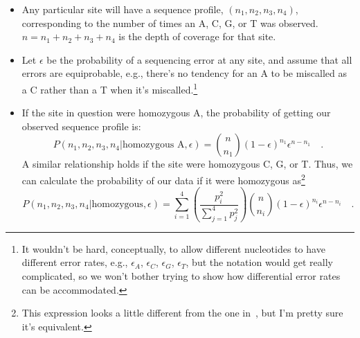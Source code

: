 \documentclass[12pt]{article}
\begin{document}
\begin{itemize}

\item Any particular site will have a sequence profile, $(n_1, n_2,
  n_3, n_4)$, corresponding to the number of times an A, C, G, or T
  was observed. $n=n_1+n_2+n_3+n_4$ is the depth of coverage for that
  site. 

\item Let $\epsilon$ be the probability of a sequencing error at any
  site, and assume that all errors are equiprobable, e.g., there's no
  tendency for an A to be miscalled as a C rather than a T when it's
  miscalled.\footnote{It wouldn't be hard, conceptually, to allow
    different nucleotides to have different error rates, e.g.,
    $\epsilon_A$, $\epsilon_C$, $\epsilon_G$, $\epsilon_T$, but the
    notation would get really complicated, so we won't bother trying
    to show how differential error rates can be accommodated.} 

\item If the site in question were homozygous A, the probability of
  getting our observed sequence profile is:
\[
P(n_1,n_2,n_3,n_4|\mbox{homozygous A},\epsilon)
=
{n \choose n_1}(1-\epsilon)^{n_1}\epsilon^{n-n_1} \quad .
\]
A similar relationship holds if the site were homozygous C, G, or
T. Thus, we can calculate the probability of our data if it were homozygous
as\footnote{This expression
    looks a little different from the one in~\cite{Lynch-2008}, but
    I'm pretty sure it's equivalent.}
\[
P(n_1,n_2,n_3,n_4|\mbox{homozygous},\epsilon)
=
\sum_{i=1}^4 \left(\frac{p_i^2}{\sum_{j=1}^4p_j^2}\right) 
{n \choose n_i}(1-\epsilon)^{n_i}\epsilon^{n-n_i}
\quad .
\]


\end{itemize}
\end{document}
